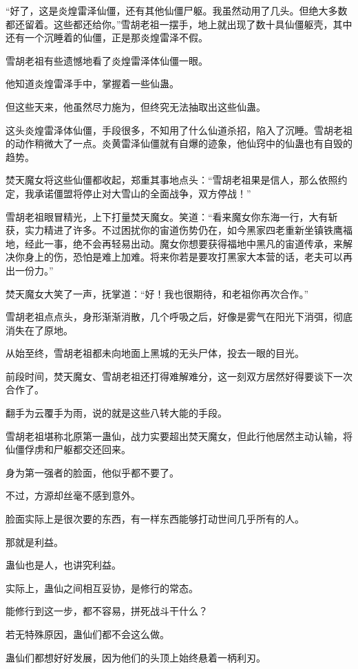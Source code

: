 \begin{this_body}
“好了，这是炎煌雷泽仙僵，还有其他仙僵尸躯。我虽然动用了几头。但绝大多数都还留着。这些都还给你。”雪胡老祖一摆手，地上就出现了数十具仙僵躯壳，其中还有一个沉睡着的仙僵，正是那炎煌雷泽不假。

雪胡老祖有些遗憾地看了炎煌雷泽体仙僵一眼。

他知道炎煌雷泽手中，掌握着一些仙蛊。

但这些天来，他虽然尽力施为，但终究无法抽取出这些仙蛊。

这头炎煌雷泽体仙僵，手段很多，不知用了什么仙道杀招，陷入了沉睡。雪胡老祖的动作稍微大了一点。炎黄雷泽仙僵就有自爆的迹象，他仙窍中的仙蛊也有自毁的趋势。

焚天魔女将这些仙僵都收起，郑重其事地点头：“雪胡老祖果是信人，那么依照约定，我承诺僵盟将停止对大雪山的全面战争，双方停战！”

雪胡老祖眼冒精光，上下打量焚天魔女。笑道：“看来魔女你东海一行，大有斩获，实力精进了许多。不过困扰你的宙道伤势仍在，如今黑家四老重新坐镇铁鹰福地，经此一事，绝不会再轻易出动。魔女你想要获得福地中黑凡的宙道传承，来解决你身上的伤，恐怕是难上加难。将来你若是要攻打黑家大本营的话，老夫可以再出一份力。”

焚天魔女大笑了一声，抚掌道：“好！我也很期待，和老祖你再次合作。”

雪胡老祖点点头，身形渐渐消散，几个呼吸之后，好像是雾气在阳光下消弭，彻底消失在了原地。

从始至终，雪胡老祖都未向地面上黑城的无头尸体，投去一眼的目光。

前段时间，焚天魔女、雪胡老祖还打得难解难分，这一刻双方居然好得要谈下一次合作了。

翻手为云覆手为雨，说的就是这些八转大能的手段。

雪胡老祖堪称北原第一蛊仙，战力实要超出焚天魔女，但此行他居然主动认输，将仙僵俘虏和尸躯都交还回来。

身为第一强者的脸面，他似乎都不要了。

不过，方源却丝毫不感到意外。

脸面实际上是很次要的东西，有一样东西能够打动世间几乎所有的人。

那就是利益。

蛊仙也是人，也讲究利益。

实际上，蛊仙之间相互妥协，是修行的常态。

能修行到这一步，都不容易，拼死战斗干什么？

若无特殊原因，蛊仙们都不会这么做。

蛊仙们都想好好发展，因为他们的头顶上始终悬着一柄利刃。


\end{this_body}
